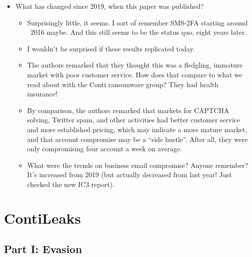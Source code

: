 \documentclass[11pt]{article}
\begin{document}
\begin{itemize}
\begin{itemize}
    \end{itemize}
    \item What has changed since 2019, when this paper was published?
    \begin{itemize}
        \item Surprisingly little, it seems. I sort of remember SMS-2FA starting around ~2016 maybe. And this still seems to be the status quo, eight years later. 
        \item I wouldn't be surprised if these results replicated today. 
        \item The authors remarked that they thought this was a fledgling, immature market with poor customer service. How does that compare to what we read about with the Conti ransomware group? They had health insurance!
        \item By comparison, the authors remarked that markets for CAPTCHA solving, Twitter spam, and other activities had better customer service and more established pricing, which may indicate a more mature market, and that account compromise may be a ``side hustle''. After all, they were only compromising four account a week on average. 
        \item What were the trends on business email compromise? Anyone remember? It's increased from 2019 (but actually decreased from last year! Just checked the new IC3 report).
    \end{itemize}
\end{itemize}

\section{ContiLeaks}

\subsection{Part I: Evasion} 
\end{document}
